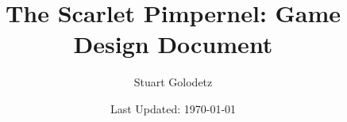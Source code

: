 \documentclass[a4paper,12pt]{report}
\begin{document}
\title{The Scarlet Pimpernel: Game Design Document}
\author{Stuart Golodetz}
\date{Last Updated: \today}
\maketitle

\tableofcontents

\dropchapter{-2cm}

\pagestyle{plain}

\addtolength{\footskip}{7mm}








\end{document}
